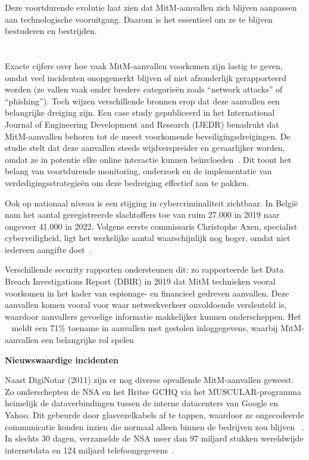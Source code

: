 Deze voortdurende evolutie laat zien dat MitM-aanvallen zich blijven aanpassen aan technologische vooruitgang. Daarom is het essentieel om ze te blijven bestuderen en bestrijden.


\section{}
\label{sec:MitM-statistieken-nieuws}

Exacte cijfers over hoe vaak MitM-aanvallen voorkomen zijn lastig te geven, omdat veel incidenten onopgemerkt blijven of niet afzonderlijk gerapporteerd worden (ze vallen vaak onder bredere categorieën zoals “network attacks” of “phishing”). Toch wijzen verschillende bronnen erop dat deze aanvallen een belangrijke dreiging zijn. Een case study gepubliceerd in het International Journal of Engineering Development and Research (IJEDR) benadrukt dat MitM-aanvallen behoren tot de meest voorkomende beveiligingsdreigingen. De studie stelt dat deze aanvallen steeds wijdverspreider en gevaarlijker worden, omdat ze in potentie elke online interactie kunnen beïnvloeden​~\autocite{Bhagat2020}. Dit toont het belang van voortdurende monitoring, onderzoek en de implementatie van verdedigingsstrategieën om deze bedreiging effectief aan te pakken.

Ook op nationaal niveau is een stijging in cybercriminaliteit zichtbaar. In België nam het aantal geregistreerde slachtoffers toe van ruim 27.000 in 2019 naar ongeveer 41.000 in 2022. Volgens eerste commissaris Christophe Axen, specialist cyberveiligheid, ligt het werkelijke aantal waarschijnlijk nog hoger, omdat niet iedereen aangifte doet​~\autocite{Politie2024}.

Verschillende security rapporten ondersteunen dit: zo rapporteerde het \textcite{Verizon2019} Data Breach Investigations Report (DBIR) in 2019 dat MitM technieken vooral voorkomen in het kader van espionage- en financieel gedreven aanvallen. Deze aanvallen komen vooral voor waar netwerkverkeer onvoldoende versleuteld is, waardoor aanvallers gevoelige informatie makkelijker kunnen onderscheppen. Het ~\autocite{IBM2024} meldt een 71\% toename in aanvallen met gestolen inloggegevens, waarbij MitM-aanvallen een belangrijke rol spelen

\vspace{0.5cm}
\textbf{Nieuwswaardige incidenten}

Naast DigiNotar (2011) zijn er nog diverse opvallende MitM-aanvallen geweest. Zo onderschepten de NSA en het Britse GCHQ via het MUSCULAR-programma heimelijk de dataverbindingen tussen de interne datacenters van Google en Yahoo. Dit gebeurde door glasvezelkabels af te tappen, waardoor ze ongecodeerde communicatie konden inzien die normaal alleen binnen de bedrijven zou blijven ~\autocite{Gallagher2013}. In slechts 30 dagen, verzamelde de NSA meer  dan 97 miljard stukken wereldwijde internetdata en 124 miljard telefoongegevens~\autocite{Zhao2022}.


